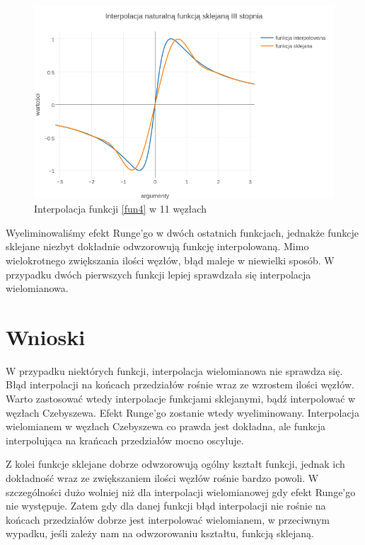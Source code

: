 \documentclass{article}
\begin{document}
\begin{figure}[ht]
	\begin{center}
		\includegraphics[width=13cm]{spline_d}
	\end{center}
	\caption{Interpolacja funkcji \eqref{fun4} w 11 węzłach}
	\label{fig:rysunek4}
\end{figure}


Wyeliminowaliśmy efekt Runge'go w dwóch ostatnich funkcjach, jednakże funkcje sklejane niezbyt dokładnie odwzorowują funkcję interpolowaną. Mimo wielokrotnego zwiększania ilości węzłów, błąd maleje w niewielki sposób. W przypadku dwóch pierwszych funkcji lepiej sprawdzała się interpolacja wielomianowa.
	
	
\section{Wnioski}

W przypadku niektórych funkcji, interpolacja wielomianowa nie sprawdza się. Błąd interpolacji na końcach przedziałów rośnie wraz ze wzrostem ilości węzłów. Warto zastosować wtedy interpolacje funkcjami sklejanymi, bądź interpolować w węzłach Czebyszewa. Efekt Runge'go zostanie wtedy wyeliminowany. 
Interpolacja wielomianem w węzłach Czebyszewa co prawda jest dokładna, ale funkcja interpolująca na krańcach przedziałów mocno oscyluje.

Z kolei funkcje sklejane dobrze odwzorowują ogólny kształt funkcji, jednak ich dokładność wraz ze zwiększaniem ilości węzłów rośnie bardzo powoli. W szczególności dużo wolniej niż dla interpolacji wielomianowej gdy efekt Runge'go nie występuje. Zatem gdy dla danej funkcji błąd interpolacji nie rośnie na końcach przedziałów dobrze jest interpolować wielomianem, w przeciwnym wypadku, jeśli zależy nam na odwzorowaniu kształtu, funkcją sklejaną. 
\end{document}
